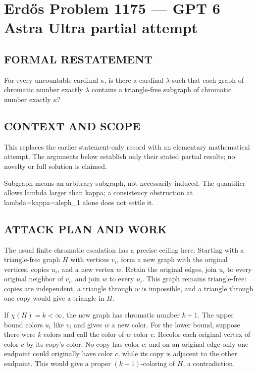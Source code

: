 \section*{Erd\H{o}s Problem 1175 --- GPT 6 Astra Ultra partial attempt}


\subsection*{FORMAL RESTATEMENT}
For every uncountable cardinal $\kappa$, is there a cardinal $\lambda$ such that each graph of chromatic number exactly $\lambda$ contains a triangle-free subgraph of chromatic number exactly $\kappa$?

\subsection*{CONTEXT AND SCOPE}
This replaces the earlier statement-only record with an elementary mathematical attempt. The arguments below establish only their stated partial results; no novelty or full solution is claimed.

Subgraph means an arbitrary subgraph, not necessarily induced. The quantifier allows lambda larger than kappa; a consistency obstruction at lambda=kappa=aleph_1 alone does not settle it.

\subsection*{ATTACK PLAN AND WORK}
The usual finite chromatic escalation has a precise ceiling here. Starting with
a triangle-free graph $H$ with vertices $v_i$, form a new graph with the original
vertices, copies $u_i$, and a new vertex $w$. Retain the original edges, join
$u_i$ to every original neighbor of $v_i$, and join $w$ to every $u_i$.
This graph remains triangle-free: copies are independent, a triangle through
$w$ is impossible, and a triangle through one copy would give a triangle in $H$.

If $\chi(H)=k<\infty$, the new graph has chromatic number $k+1$.
The upper bound colors $u_i$ like $v_i$ and gives $w$ a new color.
For the lower bound, suppose there were $k$ colors and call the color of $w$
color $c$. Recolor each original vertex of color $c$ by its copy's color.
No copy has color $c$; and on an original edge only one endpoint could originally
have color $c$, while its copy is adjacent to the other endpoint. This would
give a proper $(k-1)$-coloring of $H$, a contradiction.

